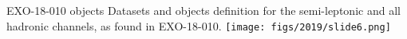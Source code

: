 \documentclass[9pt]{beamer}
\begin{document}
%

\begin{frame}{EXO-18-010 objects}
Datasets and objects definition for the semi-leptonic and all hadronic channels, as found in EXO-18-010. \vfill
\texttt{[image: figs/2019/slide6.png]} \vfill
\end{frame}
\end{document}
